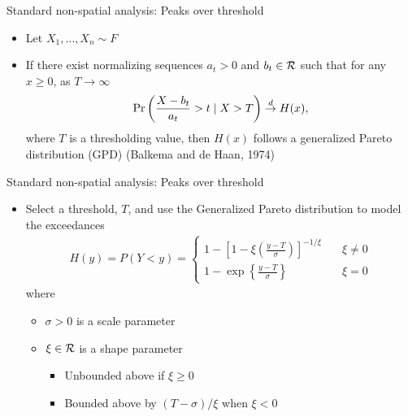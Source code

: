 \documentclass{beamer}
\begin{document}
\begin{frame}{Standard non-spatial analysis: Peaks over threshold}
  \begin{itemize} \setlength{\itemsep}{1em}
    \item Let $X_1, \ldots, X_n \sim F$
    \item If there exist normalizing sequences $a_t > 0$ and $b_t \in {\cal R}$ such that for any $x \ge 0$, as $T \rightarrow \infty$
    \begin{align*}
      \Pr\left(\frac{X - b_t}{a_t} > t \mid X > T\right) \stackrel{d}{\rightarrow} H(x),
    \end{align*}
    where $T$ is a thresholding value, then $H(x)$ follows a generalized Pareto distribution (GPD) (Balkema and de Haan, 1974)
  \end{itemize}
\end{frame}

\begin{frame}{Standard non-spatial analysis: Peaks over threshold}
  \begin{itemize}  \setlength{\itemsep}{1em}
    \item Select a threshold, $T$, and use the Generalized Pareto distribution to model the exceedances
    \begin{align*}
      H(y) = P(Y < y) = \left\{ \begin{array}{ll}
        1 - \left[1 - \xi \left( \frac{ y - T }{ \sigma } \right) \right]^{-1 / \xi} & \quad \xi \neq 0 \\[0.5em]
        1 - \exp \left\{ \frac{ y - T }{ \sigma} \right\} & \quad \xi = 0
      \end{array}\right.
    \end{align*}
    where
    \begin{itemize}
      \item $\sigma > 0$ is a scale parameter
      \item $\xi \in {\cal R}$ is a shape parameter
      \begin{itemize}
        \item Unbounded above if $\xi \ge 0$
        \item Bounded above by $(T - \sigma) / \xi$ when $\xi < 0$
      \end{itemize}
    \end{itemize}
  \end{itemize}
\end{frame}
\end{document}
